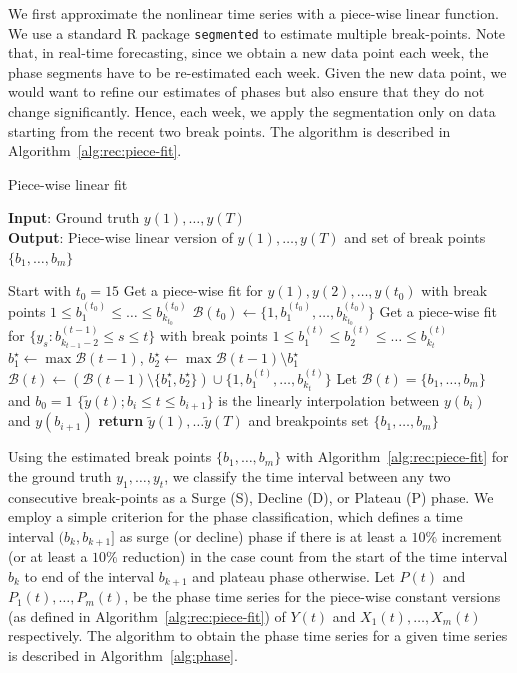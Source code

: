 \documentclass[conference,compsoc]{IEEEtran}
\begin{document}
We first approximate the nonlinear time series with a piece-wise linear function. We use a standard R package \verb|segmented| \cite{Rsegmented} to estimate multiple break-points. Note that, in real-time forecasting, since we obtain a new data point each week, the phase segments have to be re-estimated each week. Given the new data point, we would want to refine our estimates of phases but also ensure that they do not change significantly. Hence, each week, we apply the segmentation only on data starting from the recent two break points. The algorithm is described in Algorithm~\ref{alg:rec:piece-fit}.

\begin{algorithm}[ht!]
\footnotesize
\caption{Piece-wise linear fit}
\label{alg:algorithm}
\textbf{Input}: Ground truth $y(1), \dots, y(T)$\\
\textbf{Output}:  Piece-wise linear version of $y(1), \dots, y(T)$ and set of break points $\{b_1, \dots, b_{m}\}$ 
\begin{algorithmic}[1] %
\STATE  Start with $t_0=15$ 
\STATE Get a piece-wise fit for $y(1), y(2), \dots, y(t_0)$ with break points $1
\leq b_1^{(t_0)} \leq \dots\leq  b_{k_{t_0}}^{(t_0)}$
\STATE  $\mathcal{B}(t_0) \gets \{1, b_1^{(t_0)}, \dots, b_{k_{t_0}}^{(t_0)} \}$
\STATE Get a piece-wise fit for $\{y_s : b_{k_{t-1}-2}^{(t-1)}\leq s \leq t\}$
with break points $1 \leq b_1^{(t)}\leq b_2^{(t)}\leq  \dots\leq  b_{k_t}^{(t)}$
\STATE $b^\star_{1} \gets \max \mathcal{B}(t-1)$, $b^\star_{2} \gets\max \mathcal{B}(t-1) \setminus b^\star_{1}$
\STATE $\mathcal{B}(t)\gets (\mathcal{B}(t-1) \setminus \{b^\star_{1} , b^\star_{2}\}) \cup \{1,  b_1^{(t)},\dots, b_{k_t}^{(t)} \}$
\ENDWHILE
\STATE Let $\mathcal{B}(t) = \{ b_1, \dots, b_m \}$ and $b_0=1$ 
    \STATE $\{\tilde y(t);  b_i \leq t\leq b_{i+1}\}$ is the  linearly interpolation between  $y(b_i)$ and  $y(b_{i+1})$
    \ENDFOR
\STATE \textbf{return}  $\tilde y(1), \dots \tilde y(T)$ and breakpoints set $\{b_1, \dots, b_m\}$
\end{algorithmic}
\label{alg:rec:piece-fit}
\end{algorithm}

Using the estimated break points $\{b_1, \dots, b_m\}$ with Algorithm~\ref{alg:rec:piece-fit} for the ground truth $y_1, \dots, y_t$, we classify the time interval between any two consecutive break-points as a Surge (S), Decline (D), or Plateau (P) phase. We employ a simple criterion for the phase classification, which defines a time interval $(b_k, b_{k+1}]$ as surge  (or decline) phase if there is at least a $10\%$ increment (or at least a $10\%$ reduction) in the case count from the start of the time interval $b_k$ to end of the interval $b_{k+1}$ and plateau phase otherwise.
Let $P(t)$ and $P_1(t),\dots, P_m(t)$, be the phase time series for the piece-wise constant versions (as defined in Algorithm~\ref{alg:rec:piece-fit}) of $Y(t)$ and $X_1(t), \dots, X_m(t)$ respectively. The algorithm to obtain the phase time series for a given time series is described in Algorithm~\ref{alg:phase}. 
\end{document}
